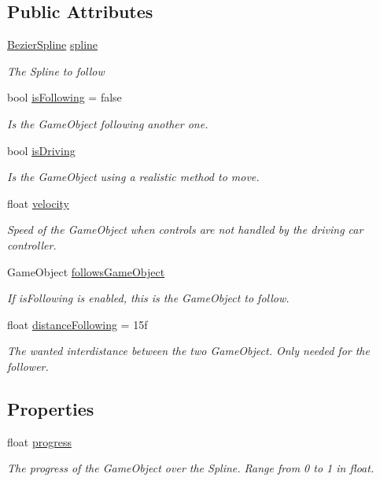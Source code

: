 \subsection*{Public Attributes}
\begin{DoxyCompactItemize}
\item 
\hyperlink{classBezierSpline}{Bezier\+Spline} \hyperlink{classSplineWalker_ad55573118c9baae295b8bb272f03cc98}{spline}
\begin{DoxyCompactList}\small\item\em The Spline to follow\end{DoxyCompactList}\item 
bool \hyperlink{classSplineWalker_a7362491b40105af4e4f55c325257d7f7}{is\+Following} = false
\begin{DoxyCompactList}\small\item\em Is the Game\+Object following another one.\end{DoxyCompactList}\item 
bool \hyperlink{classSplineWalker_a21421e86b8ad0d38e04eadb1fcb0d57c}{is\+Driving}
\begin{DoxyCompactList}\small\item\em Is the Game\+Object using a realistic method to move.\end{DoxyCompactList}\item 
float \hyperlink{classSplineWalker_a26faffe76aa7172af19af857dc183d60}{velocity}
\begin{DoxyCompactList}\small\item\em Speed of the Game\+Object when controls are not handled by the driving car controller.\end{DoxyCompactList}\item 
Game\+Object \hyperlink{classSplineWalker_a98a7d49f715f41e9a7b5bfe779f11d75}{follows\+Game\+Object}
\begin{DoxyCompactList}\small\item\em If is\+Following is enabled, this is the Game\+Object to follow.\end{DoxyCompactList}\item 
float \hyperlink{classSplineWalker_a82080d499233b63d2cbde7274e2036b6}{distance\+Following} = 15f
\begin{DoxyCompactList}\small\item\em The wanted interdistance between the two Game\+Object. Only needed for the follower.\end{DoxyCompactList}\end{DoxyCompactItemize}
\subsection*{Properties}
\begin{DoxyCompactItemize}
\item 
float \hyperlink{classSplineWalker_a261aa79e4051461acff99d39f2b09a98}{progress}
\begin{DoxyCompactList}\small\item\em The progress of the Game\+Object over the Spline. Range from 0 to 1 in float.\end{DoxyCompactList}\end{DoxyCompactItemize}
